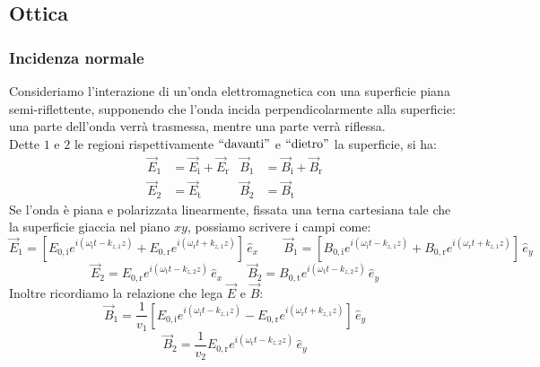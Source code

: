 \subsection{Ottica}

\newcommand{\inc}{\text{i}}
\newcommand{\tr}{\text{t}}
\newcommand{\rif}{\text{r}}

\subsubsection{Incidenza normale}

Consideriamo l'interazione di un'onda elettromagnetica con una superficie piana semi-riflettente, supponendo che l'onda incida perpendicolarmente alla superficie: una parte dell'onda verrà trasmessa, mentre una parte verrà riflessa. \\ 
Dette $ 1 $ e $ 2 $ le regioni rispettivamente $ ``\text{davanti}" $ e $ ``\text{dietro}" $ la superficie, si ha:
\begin{align}
	\vec{E}_1 &= \vec{E}_{\text{i}} + \vec{E}_{\text{r}} & \vec{B}_1 &= \vec{B}_{\text{i}} + \vec{B}_{\text{r}} \\ 
	\vec{E}_2 &= \vec{E}_{\text{t}} & \vec{B}_2 &= \vec{B}_{\text{t}}
	\label{eq:47-48}
\end{align}
Se l'onda è piana e polarizzata linearmente, fissata una terna cartesiana tale che la superficie giaccia nel piano $ xy $, possiamo scrivere i campi come:
\begin{equation}
	\vec{E}_1 = \left[E_{0,\text{i}} e^{i(\omega_{\inc} t - k_{z,1} z)} + E_{0,\rif} e^{i(\omega_{\rif} t + k_{z,1} z)} \right]\,\hat{e}_x \qquad \vec{B}_1 = \left[B_{0,\text{i}} e^{i(\omega_{\inc} t - k_{z,1} z)} + B_{0,\rif} e^{i(\omega_{\rif} t + k_{z,1} z)} \right]\,\hat{e}_y
	\label{eq:49}
\end{equation}
\begin{equation}
	\vec{E}_2 = E_{0,\rif} e^{i(\omega_{\tr} t - k_{z,2} z)}\,\hat{e}_x \qquad \vec{B}_2 = B_{0,\tr} e^{i(\omega_{\tr} t - k_{z,2} z)}\,\hat{e}_y
	\label{eq:50}
\end{equation}
Inoltre ricordiamo la relazione che lega $ \vec{E} $ e $ \vec{B} $:
\begin{equation}
	\vec{B}_1 = \frac{1}{v_1} \left[E_{0,\text{i}} e^{i(\omega_{\inc} t - k_{z,1} z)} - E_{0,\rif} e^{i(\omega_{\rif} t + k_{z,1} z)} \right]\,\hat{e}_y
	\label{eq:51}
\end{equation}
\begin{equation}
	\vec{B}_2 = \frac{1}{v_2} E_{0,\rif} e^{i(\omega_{\tr} t - k_{z,2} z)}\,\hat{e}_y
	\label{eq:52}
\end{equation}

